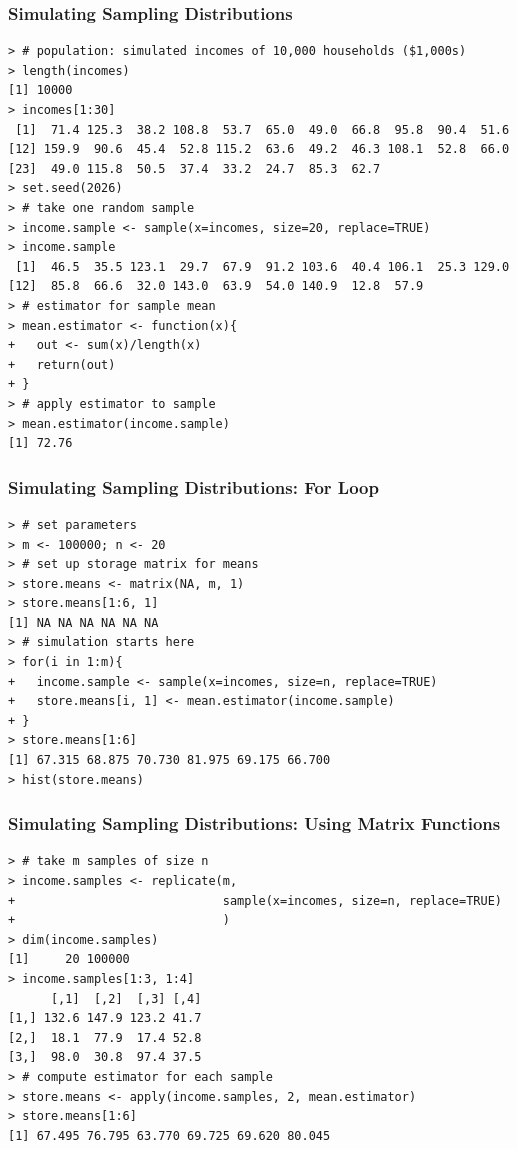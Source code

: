 \documentclass[xcolor=svgnames,9pt,english,aspectratio=169,t]{beamer}
\begin{document}
\begin{frame}[fragile]
  \frametitle{Simulating Sampling Distributions}
  \scriptsize
\begin{Verbatim}[frame=single, label=R Code]
> # population: simulated incomes of 10,000 households ($1,000s)
> length(incomes)
[1] 10000
> incomes[1:30]
 [1]  71.4 125.3  38.2 108.8  53.7  65.0  49.0  66.8  95.8  90.4  51.6
[12] 159.9  90.6  45.4  52.8 115.2  63.6  49.2  46.3 108.1  52.8  66.0
[23]  49.0 115.8  50.5  37.4  33.2  24.7  85.3  62.7
> set.seed(2026)
> # take one random sample
> income.sample <- sample(x=incomes, size=20, replace=TRUE)
> income.sample
 [1]  46.5  35.5 123.1  29.7  67.9  91.2 103.6  40.4 106.1  25.3 129.0
[12]  85.8  66.6  32.0 143.0  63.9  54.0 140.9  12.8  57.9
> # estimator for sample mean
> mean.estimator <- function(x){
+   out <- sum(x)/length(x)
+   return(out)
+ }
> # apply estimator to sample
> mean.estimator(income.sample)
[1] 72.76
\end{Verbatim}
\end{frame}


\begin{frame}[fragile]
  \frametitle{Simulating Sampling Distributions: For Loop}
  \scriptsize
\begin{Verbatim}[frame=single, label=R Code]
> # set parameters
> m <- 100000; n <- 20
> # set up storage matrix for means
> store.means <- matrix(NA, m, 1)
> store.means[1:6, 1]
[1] NA NA NA NA NA NA
> # simulation starts here
> for(i in 1:m){
+   income.sample <- sample(x=incomes, size=n, replace=TRUE)
+   store.means[i, 1] <- mean.estimator(income.sample)
+ }
> store.means[1:6]
[1] 67.315 68.875 70.730 81.975 69.175 66.700
> hist(store.means)
\end{Verbatim}
\end{frame}

\begin{frame}[fragile]
  \frametitle{Simulating Sampling Distributions: Using Matrix Functions}
  \scriptsize
\begin{Verbatim}[frame=single, label=R Code]
> # take m samples of size n
> income.samples <- replicate(m,
+                             sample(x=incomes, size=n, replace=TRUE)
+                             )
> dim(income.samples)
[1]     20 100000
> income.samples[1:3, 1:4]
      [,1]  [,2]  [,3] [,4]
[1,] 132.6 147.9 123.2 41.7
[2,]  18.1  77.9  17.4 52.8
[3,]  98.0  30.8  97.4 37.5
> # compute estimator for each sample
> store.means <- apply(income.samples, 2, mean.estimator)
> store.means[1:6]
[1] 67.495 76.795 63.770 69.725 69.620 80.045
\end{Verbatim}
\end{frame}
\end{document}
